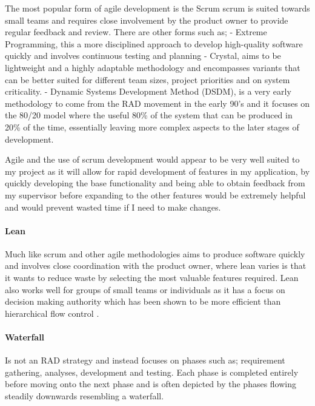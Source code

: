The most popular form of agile development is the Scrum
\parencite{agile} scrum is suited towards small teams and requires close
involvement by the product owner to provide regular feedback and review.
There are other forms such as; - Extreme Programming, this a more
disciplined approach to develop high-quality software quickly and
involves continuous testing and planning - Crystal, aims to be
lightweight and a highly adaptable methodology and encompasses variants
that can be better suited for different team sizes, project priorities
and on system criticality. \parencite{agilemethods} - Dynamic Systems
Development Method (DSDM), is a very early methodology to come from the
RAD movement in the early 90's and it focuses on the 80/20 model where
the useful 80\% of the system that can be produced in 20\% of the time,
essentially leaving more complex aspects to the later stages of
development. \parencite{agilemethods}

Agile and the use of scrum development would appear to be very well
suited to my project as it will allow for rapid development of features
in my application, by quickly developing the base functionality and
being able to obtain feedback from my supervisor before expanding to the
other features would be extremely helpful and would prevent wasted time
if I need to make changes.

\paragraph{Lean}\label{lean}

Much like scrum and other agile methodologies aims to produce software
quickly and involves close coordination with the product owner, where
lean varies is that it wants to reduce waste by selecting the most
valuable features required. Lean also works well for groups of small
teams or individuals as it has a focus on decision making authority
which has been shown to be more efficient than hierarchical flow control
\parencite{agilemethods}.

\paragraph{Waterfall}\label{waterfall}

Is not an RAD strategy and instead focuses on phases such as;
requirement gathering, analyses, development and testing. Each phase is
completed entirely before moving onto the next phase and is often
depicted by the phases flowing steadily downwards resembling a
waterfall.

